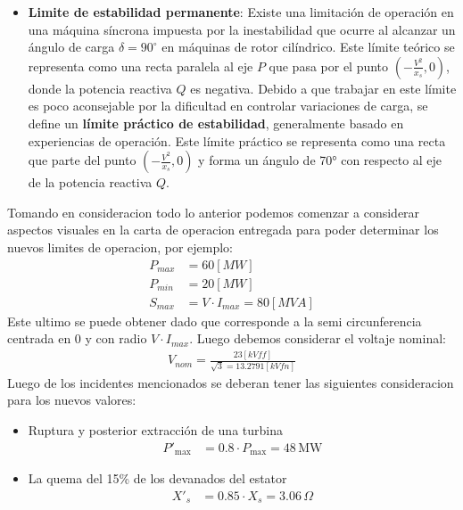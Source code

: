 \documentclass[
  11pt,
  letterpaper,
   addpoints,
   answers
  ]{exam}
\begin{document}
\begin{questions}
\begin{solution}
\begin{itemize}
            \item \textbf{Limite de estabilidad permanente}: Existe una limitación de operación en una máquina síncrona impuesta por la inestabilidad que ocurre al alcanzar un ángulo de carga \( \delta = 90^\circ \) en máquinas de rotor cilíndrico. Este límite teórico se representa como una recta paralela al eje \( P \) que pasa por el punto \( \left(-\frac{V^2}{x_s}, 0\right) \), donde la potencia reactiva \( Q \) es negativa. Debido a que trabajar en este límite es poco aconsejable por la dificultad en controlar variaciones de carga, se define un \textbf{límite práctico de estabilidad}, generalmente basado en experiencias de operación. Este límite práctico se representa como una recta que parte del punto \( \left(-\frac{V^2}{x_s}, 0\right) \) y forma un ángulo de 70° con respecto al eje de la potencia reactiva \( Q \).
        \end{itemize}
        Tomando en consideracion todo lo anterior podemos comenzar a considerar aspectos visuales en la carta de operacion entregada para poder determinar los nuevos limites de operacion, por ejemplo:
        \begin{align}
            P_{max} &= 60[MW]\\
            P_{min} &= 20[MW]\\
            S_{max} &= V \cdot I_{max}= 80[MVA]
        \end{align}
        Este ultimo se puede obtener dado que corresponde a la semi circunferencia centrada en 0 y con radio $V \cdot I_{max}$. Luego debemos considerar el voltaje nominal:
        \begin{align}
            V_{nom} = \frac{23[kVff]}{\sqrt{3} = 13.2791[kVfn]}
        \end{align}
        Luego de los incidentes mencionados se deberan tener las siguientes consideracion para los nuevos valores:
        \begin{itemize}
            \item Ruptura y posterior extracción de una turbina
            \begin{align}
            P'_{\text{max}} &= 0.8 \cdot P_{\text{max}} = 48 \, \text{MW}
            \end{align}
        
            \item La quema del 15\% de los devanados del estator
            \begin{align}
            X'_{s} &= 0.85 \cdot X_{s} = 3.06 \, \Omega
            \end{align}
        

\end{itemize}
\end{solution}
\end{questions}
\end{document}
